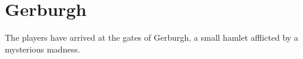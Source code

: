 \documentclass[10pt,twoside,twocolumn]{article}
\begin{document}
\selectfont %








\section{Gerburgh}
The players have arrived at the gates of Gerburgh, a small hamlet afflicted by a mysterious madness.
\end{document}
